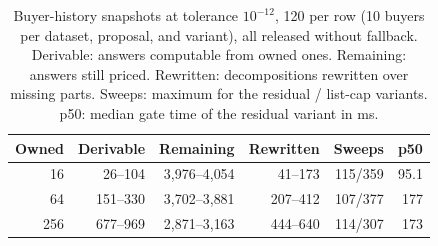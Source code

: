 \begin{table}[t]
\centering
\caption{Buyer-history snapshots at tolerance $10^{-12}$, 120 per row (10 buyers per dataset, proposal, and variant), all released without fallback. Derivable: answers computable from owned ones. Remaining: answers still priced. Rewritten: decompositions rewritten over missing parts. Sweeps: maximum for the residual / list-cap variants. p50: median gate time of the residual variant in ms.}
\label{tab:history}
\footnotesize
\setlength{\tabcolsep}{3pt}
\begin{tabular}{@{}rrrrrr@{}}
\toprule
Owned & Derivable & Remaining & Rewritten & Sweeps & p50 \\
\midrule
16 & 26--104 & 3{,}976--4{,}054 & 41--173 & 115/359 & 95.1 \\
64 & 151--330 & 3{,}702--3{,}881 & 207--412 & 107/377 & 177 \\
256 & 677--969 & 2{,}871--3{,}163 & 444--640 & 114/307 & 173 \\
\bottomrule
\end{tabular}
\end{table}

